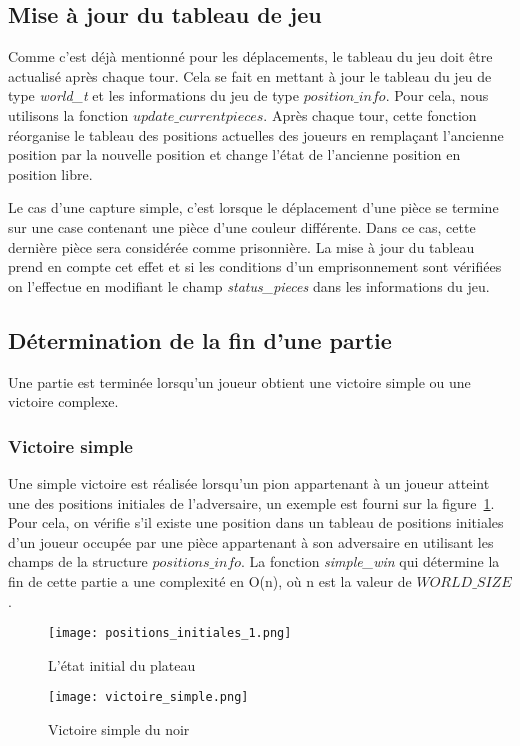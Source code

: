\documentclass[11pt]{article}
\begin{document}
        \subsection{Mise à jour du tableau de jeu}
            Comme c'est déjà mentionné pour les déplacements, le tableau du jeu doit être actualisé après chaque tour. Cela se fait en mettant à jour le tableau du jeu de type \textit{world\_t} et les informations du jeu de type $position\_info$. Pour cela, nous utilisons la fonction $update\_current pieces$. Après chaque tour, cette fonction réorganise le tableau des positions actuelles des joueurs en remplaçant l'ancienne position par la nouvelle position et change l'état de l'ancienne position en position libre.
            
            Le cas d'une capture simple, c'est lorsque le déplacement d'une pièce se termine sur une case contenant une pièce d'une couleur différente. Dans ce cas, cette dernière pièce sera considérée comme prisonnière. La mise à jour du tableau prend en compte cet effet et si les conditions d'un emprisonnement sont vérifiées on l'effectue en modifiant le champ \textit{status\_pieces} dans les informations du jeu.
            \newpage
        \subsection{Détermination de la fin d'une partie }
            Une partie est terminée lorsqu'un joueur obtient une victoire simple ou une victoire complexe.
                \subsubsection*{Victoire simple}
                    Une simple victoire est réalisée lorsqu'un pion appartenant à un joueur atteint une des positions initiales de l'adversaire, un exemple est fourni sur la figure~\ref{figure19}. Pour cela, on vérifie s'il existe une position dans un tableau de positions initiales d'un joueur occupée par une pièce appartenant à son adversaire en utilisant les champs de la structure $positions\_info$. La fonction \textit{simple\_win} qui détermine la fin de cette partie a une complexité en O(n), où n est la valeur de $WORLD\_SIZE$.
                \begin{figure}[h]
                \begin{minipage}[c]{0.45\linewidth}
                    \centering
                    \texttt{[image: positions\_initiales\_1.png]}
                    \caption{L'état initial du plateau }
                    \label{figure18}
                \end{minipage}
                \hfill
                \begin{minipage}[c]{0.45\linewidth}
                    \centering
                    \texttt{[image: victoire\_simple.png]}
                    \caption{Victoire simple du noir }
                    \label{figure19}
                \end{minipage}
            \end{figure}
\end{document}
